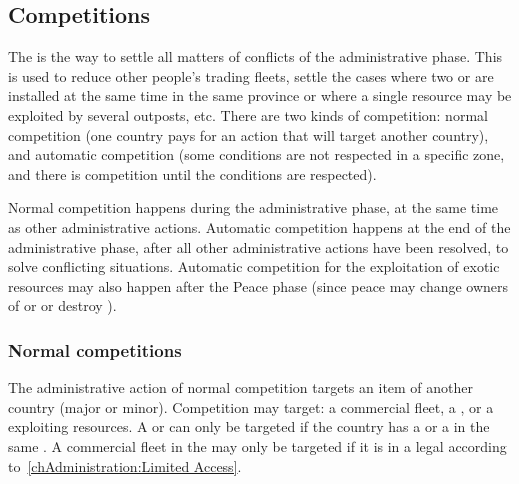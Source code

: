 \subsection{Competitions}\label{chAdministration:Competition}

\aparag The  is the way to settle all matters of
conflicts of the administrative phase. This is used to reduce other people's
trading fleets, settle the cases where two \TP or \COL are installed at the
same time in the same province or where a single resource may be exploited by
several outposts, etc. There are two kinds of competition: normal competition
(one country pays for an action that will target another country), and
automatic competition (some conditions are not respected in a specific zone,
and there is competition until the conditions are respected).

\aparag[Sequence] Normal competition happens during the administrative phase,
at the same time as other administrative actions. Automatic competition
happens at the end of the administrative phase, after all other administrative
actions have been resolved, to solve conflicting situations. Automatic
competition for the exploitation of exotic resources may also happen after the
Peace phase (since peace may change owners of \TP or \COL or destroy \TP).

\subsubsection{Normal competitions}
\aparag[Target] The administrative action of normal competition targets an
item of another country (major or minor).
\bparag Competition may target: a commercial fleet, a \TP, or a \COL
exploiting resources.
\bparag A \TP or \COL can only be targeted if the country has a \TP or a \COL
in the same \Area.
\bparag A commercial fleet in the \ROTW may only be targeted if it is in a
legal \STZ according to~\ref{chAdministration:Limited Access}.

